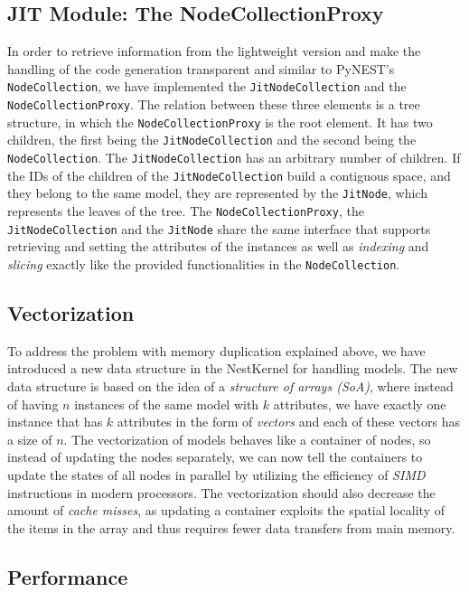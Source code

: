 \subsection*{JIT Module: The NodeCollectionProxy}

In order to retrieve information from the lightweight version and make the handling of the code generation transparent and similar to PyNEST's \texttt{NodeCollection}, we have implemented the \texttt{JitNodeCollection} and the \texttt{NodeCollectionProxy}. The relation between these three elements is a tree structure, in which the \texttt{NodeCollectionProxy} is the root element. It has two children, the first being the \texttt{JitNodeCollection} and the second being the \texttt{NodeCollection}. The \texttt{JitNodeCollection} has an arbitrary number of children. If the IDs of the children of the \texttt{JitNodeCollection} build a contiguous space, and they belong to the same model, they are represented by the \texttt{JitNode}, which represents the leaves of the tree. The \texttt{NodeCollectionProxy}, the \texttt{JitNodeCollection} and the \texttt{JitNode} share the same interface that supports retrieving and setting the attributes of the instances as well as \emph{indexing} and \emph{slicing} exactly like the provided functionalities in the \texttt{NodeCollection}.

\subsection*{Vectorization}

To address the problem with memory duplication explained above, we have introduced a new data structure in the NestKernel for handling models. The new data structure is based on the idea of a \emph{structure of arrays (SoA)}, where instead of having $n$ instances of the same model with $k$ attributes, we have exactly one instance that has $k$ attributes in the form of \emph{vectors} and each of these vectors has a size of $n$. The vectorization of models behaves like a container of nodes, so instead of updating the nodes separately, we can now tell the containers to update the states of all nodes in parallel by utilizing the efficiency of \emph{SIMD} instructions in modern processors. The vectorization should also decrease the amount of \emph{cache misses}, as updating a container exploits the spatial locality of the items in the array and thus requires fewer data transfers from main memory.

\subsection*{Performance}

